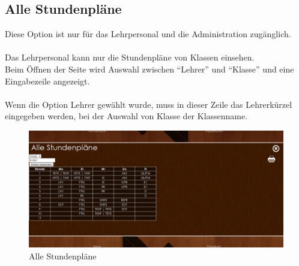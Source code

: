 \subsection{Alle Stundenpläne}
Diese Option ist nur für das Lehrpersonal und die Administration zugänglich.\\\\
Das Lehrpersonal kann nur die Stundenpläne von Klassen einsehen.\\
Beim Öffnen der Seite wird Auswahl zwischen \enquote{Lehrer} und \enquote{Klasse} und eine Eingabezeile angezeigt.\\
\\
Wenn die Option Lehrer gewählt wurde, muss in dieser Zeile das Lehrerkürzel eingegeben werden, bei der Auswahl von Klasse der Klassenname.

\begin{figure}[H]
\centering
\includegraphics[keepaspectratio=true, width=14cm]{images/screenshots/timetable_all.png}
\caption{Alle Stundenpläne}
\label{fig:Web_all_timetable}
\end{figure}
